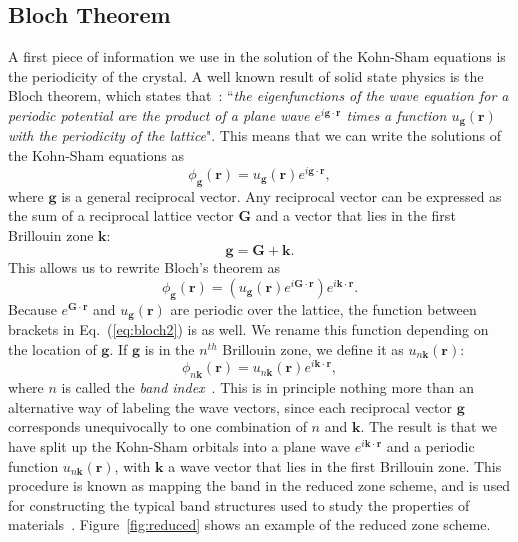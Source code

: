 \begin{refsection}
\subsection{Bloch Theorem}\label{dft:sec-bloch}

A first piece of information we use in the solution of the Kohn-Sham equations is the periodicity of the crystal. A well known result of solid state physics is the Bloch theorem, which states that~\cite{Kittel2005}: ``\textit{the eigenfunctions of the wave equation for a periodic potential are the product of a plane wave $e^{i\mathbf{g}\cdot \mathbf{r}}$ times a function $u_{\mathbf{g}}(\mathbf{r})$ with the periodicity of the lattice}". This means that we can write the solutions of the Kohn-Sham equations as
\begin{equation}
\phi_{\mathbf{g}}(\mathbf{r}) = u_{\mathbf{g}}(\mathbf{r}) e^{i\mathbf{g}\cdot \mathbf{r}},
\end{equation}
where $\mathbf{g}$ is a general reciprocal vector. Any reciprocal vector can be expressed as the sum of a reciprocal lattice vector $\mathbf{G}$ and a vector that lies in the first Brillouin zone $\mathbf{k}$: 
\begin{equation}
\mathbf{g} = \mathbf{G} + \mathbf{k}.
\end{equation}
This allows us to rewrite Bloch's theorem as
\begin{equation}\label{eq:bloch2}
\phi_{\mathbf{g}}(\mathbf{r}) = \left( u_{\mathbf{g}}(\mathbf{r}) e^{i\mathbf{G}\cdot \mathbf{r}}\right)e^{i\mathbf{k}\cdot \mathbf{r}}.
\end{equation}
Because $e^{\mathbf{G}\cdot\mathbf{r}}$ and $u_{\mathbf{g}}(\mathbf{r})$ are periodic over the lattice, the function between brackets in Eq.~(\ref{eq:bloch2}) is as well. We rename this function depending on the location of $\mathbf{g}$. If $\mathbf{g}$ is in the $n^{th}$ Brillouin zone, we define it as $u_{n\mathbf{k}}(\mathbf{r})$:
\begin{equation}\label{bloch}
\phi_{n\mathbf{k}}(\mathbf{r}) = u_{n\mathbf{k}}(\mathbf{r}) e^{i\mathbf{k}\cdot \mathbf{r}},
\end{equation}
where $n$ is called the \textit{band index}~\cite{Cottenier2004}. This is in principle nothing more than an alternative way of labeling the wave vectors, since each reciprocal vector $\mathbf{g}$ corresponds unequivocally to one combination of $n$ and $\mathbf{k}$. The result is that we have split up the Kohn-Sham orbitals into a plane wave $e^{i\mathbf{k}\cdot \mathbf{r}}$ and a periodic function $u_{n\mathbf{k}}(\mathbf{r})$, with $\mathbf{k}$ a wave vector that lies in the first Brillouin zone. This procedure is known as mapping the band in the reduced zone scheme, and is used for constructing the typical band structures used to study the properties of materials~\cite{Kittel2005}. Figure~\ref{fig:reduced} shows an example of the reduced zone scheme.


\end{refsection}
